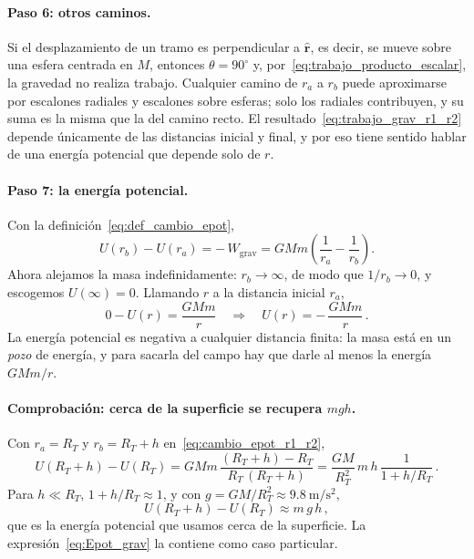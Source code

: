 \paragraph{Paso 6: otros caminos.}
Si el desplazamiento de un tramo es perpendicular a $\hat{\boldsymbol{r}}$,
es decir, se mueve sobre una esfera centrada en $M$, entonces $\theta =
90^{\circ}$ y, por~\eqref{eq:trabajo_producto_escalar}, la gravedad no
realiza trabajo. Cualquier camino de $r_{a}$ a $r_{b}$ puede aproximarse por
escalones radiales y escalones sobre esferas; solo los radiales contribuyen,
y su suma es la misma que la del camino recto. El
resultado~\eqref{eq:trabajo_grav_r1_r2} depende únicamente de las distancias
inicial y final, y por eso tiene sentido hablar de una energía potencial que
depende solo de $r$.

\paragraph{Paso 7: la energía potencial.}
Con la definición~\eqref{eq:def_cambio_epot},
\begin{equation}
  U(r_{b}) - U(r_{a})
  = -\,W_{\text{grav}}
  = GMm\left(\frac{1}{r_{a}} - \frac{1}{r_{b}}\right) .
  \label{eq:cambio_epot_r1_r2}
\end{equation}
Ahora alejamos la masa indefinidamente: $r_{b} \to \infty$, de modo que
$1/r_{b} \to 0$, y escogemos $U(\infty) = 0$. Llamando $r$ a la
distancia inicial $r_{a}$,
\begin{equation}
  0 - U(r) = \frac{GMm}{r}
  \quad\Longrightarrow\quad
  \boxed{U(r) = -\,\frac{GMm}{r}} \,.
  \label{eq:Epot_grav}
\end{equation}
La energía potencial es negativa a cualquier distancia finita: la masa está en
un \emph{pozo} de energía, y para sacarla del campo hay que darle al menos la
energía $GMm/r$.

\paragraph{Comprobación: cerca de la superficie se recupera $mgh$.}
Con $r_{a} = R_{T}$ y $r_{b} = R_{T} + h$ en~\eqref{eq:cambio_epot_r1_r2},
\begin{equation}
  U(R_{T} + h) - U(R_{T})
  = GMm\,\frac{(R_{T} + h) - R_{T}}{R_{T}\,(R_{T} + h)}
  = \frac{GM}{R_{T}^{2}}\,m\,h\,\frac{1}{1 + h/R_{T}} \,.
  \label{eq:epot_cerca_exacta}
\end{equation}
Para $h \ll R_{T}$, $1 + h/R_{T} \approx 1$, y con
$g = GM/R_{T}^{2} \approx \SI{9.8}{\meter\per\second\squared}$,
\begin{equation}
  U(R_{T} + h) - U(R_{T}) \approx m\,g\,h \,,
  \label{eq:epot_cerca_mgh}
\end{equation}
que es la energía potencial que usamos cerca de la superficie. La
expresión~\eqref{eq:Epot_grav} la contiene como caso particular.
